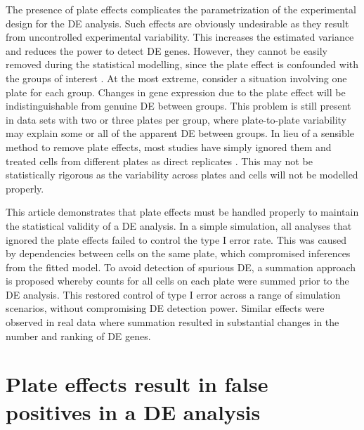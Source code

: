 \documentclass{article}
\begin{document}
The presence of plate effects complicates the parametrization of the experimental design for the DE analysis.
Such effects are obviously undesirable as they result from uncontrolled experimental variability.
This increases the estimated variance and reduces the power to detect DE genes.
However, they cannot be easily removed during the statistical modelling, since the plate effect is confounded with the groups of interest \cite{hicks2015widespread}.
At the most extreme, consider a situation involving one plate for each group.
Changes in gene expression due to the plate effect will be indistinguishable from genuine DE between groups.
This problem is still present in data sets with two or three plates per group, where plate-to-plate variability may explain some or all of the apparent DE between groups.
In lieu of a sensible method to remove plate effects, most studies have simply ignored them and treated cells from different plates as direct replicates \cite{kolod2015single,trapnell2014dynamics,avraham2015pathogen}.
This may not be statistically rigorous as the variability across plates and cells will not be modelled properly.

This article demonstrates that plate effects must be handled properly to maintain the statistical validity of a DE analysis.
In a simple simulation, all analyses that ignored the plate effects failed to control the type I error rate.
This was caused by dependencies between cells on the same plate, which compromised inferences from the fitted model.
To avoid detection of spurious DE, a summation approach is proposed whereby counts for all cells on each plate were summed prior to the DE analysis.
This restored control of type I error across a range of simulation scenarios, without compromising DE detection power.
Similar effects were observed in real data where summation resulted in substantial changes in the number and ranking of DE genes.

\section{Plate effects result in false positives in a DE analysis}
\end{document}
